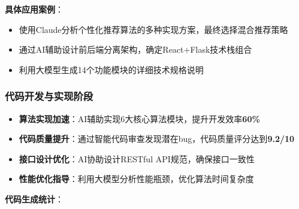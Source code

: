 \documentclass[12pt,a4paper]{article}
\begin{document}
\textbf{具体应用案例}：
\begin{itemize}
    \item 使用Claude分析个性化推荐算法的多种实现方案，最终选择混合推荐策略
    \item 通过AI辅助设计前后端分离架构，确定React+Flask技术栈组合
    \item 利用大模型生成14个功能模块的详细技术规格说明
\end{itemize}

\subsubsection{代码开发与实现阶段}

\begin{warningbox}[title={代码生成与优化实践}]
\begin{itemize}[nosep]
    \item \textbf{算法实现加速}：AI辅助实现6大核心算法模块，提升开发效率\textcolor{success}{\textbf{60\%}}
    \item \textbf{代码质量提升}：通过智能代码审查发现潜在bug，代码质量评分达到\textcolor{success}{\textbf{9.2/10}}
    \item \textbf{接口设计优化}：AI协助设计RESTful API规范，确保接口一致性
    \item \textbf{性能优化指导}：利用大模型分析性能瓶颈，优化算法时间复杂度
\end{itemize}
\end{warningbox}

\textbf{代码生成统计}：
\end{document}
